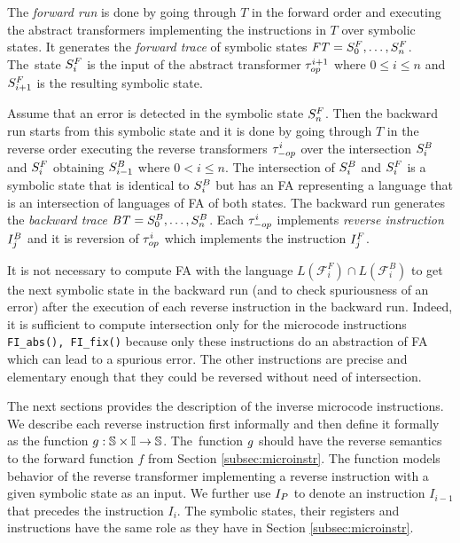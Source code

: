 The \emph{forward run} is done by going through $T$ in the forward order
and executing the abstract transformers implementing the instructions in $T$
over symbolic states.
It generates the \emph{forward trace} of symbolic states $\mathit{FT}=S^{F}_0, \ldots, S^{F}_n$.
The~state $S^{F}_{i}$ is the input of the abstract transformer $\tau_{op}^{i+1}$
where $ 0 \leq i \leq n$ and $S^{F}_{i+1}$ is the resulting symbolic state.

Assume that an error is detected in the symbolic state $S^{F}_{n}$.
Then the backward run starts from this symbolic state
and it is done by going through $T$ in the reverse order
executing the reverse transformers $\tau_{-op}^{i}$
over the intersection $S^{B}_{i}$ and $S^{F}_{i}$ obtaining $S^{B}_{i-1}$ where $0 < i \leq n$.
The intersection of $S^{B}_{i}$ and $S^{F}_{i}$ is a symbolic state that is identical
to $S^{B}_{i}$ but has an FA representing a language
that is an intersection of languages of FA of both states.
The backward run generates the \emph{backward trace} $\mathit{BT}=S^{B}_0, \ldots, S^{B}_n$.
Each $\tau_{-op}^{i}$ implements \emph{reverse instruction} $I^{B}_{j}$
and it is reversion of $\tau_{op}^{i}$ which implements the instruction $I_{j}^{F}$.

It is not necessary to compute FA with the language
$L(\mathcal{F}_i^F) \cap L(\mathcal{F}_i^B)$ to get the next
symbolic state in the backward run (and to check spuriousness of an error)
after the execution of each reverse instruction in the backward run.
Indeed, it is sufficient to compute intersection only for
the microcode instructions {\tt FI\_abs(), FI\_fix()}
because only these instructions do an abstraction of FA
which can lead to a spurious error.
The other instructions are precise and elementary enough
that they could be reversed without need of intersection.

The next sections provides the description of the inverse microcode instructions.
We describe each reverse instruction first informally
and then define it formally as the function $g: \mathbb{S} \times \mathbb{I} \rightarrow \mathbb{S}$.
The~function $g$ should have the reverse semantics
to the forward function $f$ from Section \ref{subsec:microinstr}.
The function models behavior of the reverse transformer
implementing a reverse instruction with a given symbolic state as an input.
We further use $I_{P}$ to denote an instruction $I_{i-1}$
that precedes the instruction $I_{i}$.
The symbolic states, their registers and instructions have the
same role as they have in Section \ref{subsec:microinstr}.

